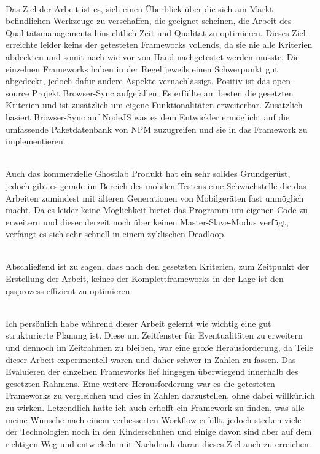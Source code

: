 \\
Das Ziel der Arbeit ist es, sich einen Überblick über die sich am Markt befindlichen Werkzeuge zu verschaffen, die geeignet scheinen, die Arbeit des Qualitätsmanagements hinsichtlich Zeit und Qualität zu optimieren. Dieses Ziel erreichte leider keins der getesteten \Gls{Framework}s vollends, da sie nie alle Kriterien abdeckten und somit nach wie vor von Hand nachgetestet werden musste. 
Die einzelnen \Gls{Framework}s haben in der Regel jeweils einen Schwerpunkt gut abgedeckt, jedoch dafür andere Aspekte vernachlässigt. Positiv ist das open-source Projekt Browser-Sync aufgefallen. Es erfüllte am besten die gesetzten Kriterien und ist zusätzlich um eigene Funktionalitäten erweiterbar. Zusätzlich basiert Browser-Sync auf \gls{NodeJS} was es dem Entwickler ermöglicht auf die umfassende Paketdatenbank von \Gls{NPM} zuzugreifen und sie in das \Gls{Framework} zu implementieren. 

\\Auch das kommerzielle Ghostlab Produkt hat ein sehr solides Grundgerüst, jedoch gibt es gerade im Bereich des mobilen Testens eine Schwachstelle die das Arbeiten zumindest mit älteren Generationen von Mobilgeräten fast unmöglich macht. Da es leider keine Möglichkeit bietet das Programm um eigenen Code zu erweitern und dieser derzeit noch über keinen Master-Slave-Modus verfügt, verfängt es sich sehr schnell in einem zyklischen Deadloop.

\\Abschließend ist zu sagen, dass nach den gesetzten Kriterien, zum Zeitpunkt der Erstellung der Arbeit, keines der Komplettframeworks in der Lage ist den \Gls{qs}sprozess effizient zu optimieren.

\\Ich persönlich habe während dieser Arbeit gelernt wie wichtig eine gut strukturierte Planung ist. Diese um Zeitfenster für Eventualitäten zu erweitern und dennoch im Zeitrahmen zu bleiben, war eine große Herausforderung, da Teile dieser Arbeit experimentell waren und daher schwer in Zahlen zu fassen. Das Evaluieren der einzelnen \Gls{Framework}s lief hingegen überwiegend innerhalb des gesetzten Rahmens. Eine weitere Herausforderung war es die getesteten \Gls{Framework}s zu vergleichen und dies in Zahlen darzustellen, ohne dabei willkürlich zu wirken. Letzendlich hatte ich auch erhofft ein \Gls{Framework} zu finden, was alle meine Wünsche nach einem verbesserten Workflow erfüllt, jedoch stecken viele der Technologien noch in den Kinderschuhen und einige davon sind aber auf dem richtigen Weg und entwickeln mit Nachdruck daran dieses Ziel auch zu erreichen.


